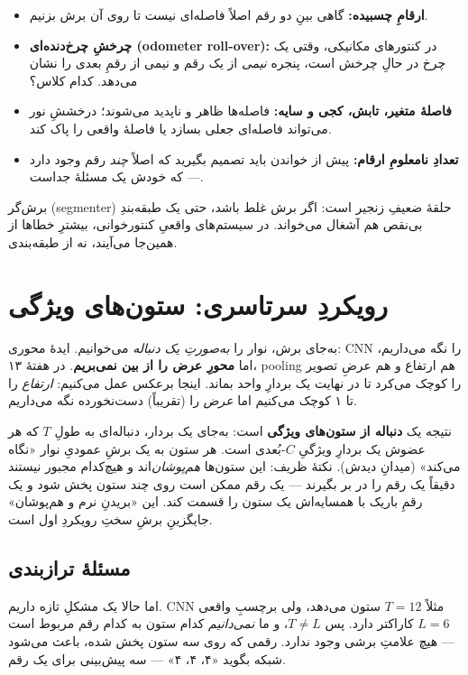 \documentclass[12pt,a4paper]{article}
\begin{document}
\begin{itemize}
  \item \textbf{ارقامِ چسبیده:} گاهی بینِ دو رقم اصلاً فاصله‌ای نیست تا روی آن برش بزنیم.
  \item \textbf{چرخشِ چرخ‌دنده‌ای (odometer roll-over):} در کنتورهای مکانیکی، وقتی یک چرخ در حالِ چرخش است، پنجره \emph{نیمی} از یک رقم و نیمی از رقمِ بعدی را نشان می‌دهد. کدام کلاس؟
  \item \textbf{فاصلهٔ متغیر، تابش، کجی و سایه:} فاصله‌ها ظاهر و ناپدید می‌شوند؛ درخششِ نور می‌تواند فاصله‌ای جعلی بسازد یا فاصلهٔ واقعی را پاک کند.
  \item \textbf{تعدادِ نامعلومِ ارقام:} پیش از خواندن باید تصمیم بگیرید که اصلاً \emph{چند} رقم وجود دارد — که خودش یک مسئلهٔ جداست.
\end{itemize}

\begin{hoshdar}
برش‌گر (segmenter) حلقهٔ ضعیفِ زنجیر است: اگر برش غلط باشد، حتی یک طبقه‌بندِ بی‌نقص هم آشغال می‌خواند. در سیستم‌های واقعیِ کنتورخوانی، بیشترِ خطاها از همین‌جا می‌آیند، نه از طبقه‌بندی.
\end{hoshdar}

\section{رویکردِ سرتاسری: ستون‌های ویژگی}

به‌جای برش، نوار را \emph{به‌صورتِ یک دنباله} می‌خوانیم. ایدهٔ محوری: CNN را نگه می‌داریم، اما \textbf{محورِ عرض را از بین نمی‌بریم}. در هفتهٔ ۱۳، pooling هم ارتفاع و هم عرضِ تصویر را کوچک می‌کرد تا در نهایت یک بردارِ واحد بماند. اینجا برعکس عمل می‌کنیم: \emph{ارتفاع} را تا ۱ کوچک می‌کنیم اما \emph{عرض} را (تقریباً) دست‌نخورده نگه می‌داریم.

نتیجه یک \textbf{دنباله از ستون‌های ویژگی} است: به‌جای یک بردار، دنباله‌ای به طولِ $T$ که هر عضوش یک بردارِ ویژگیِ $C$-بُعدی است. هر ستون به یک برشِ عمودیِ نوار «نگاه می‌کند» (میدانِ دیدش). نکتهٔ ظریف: این ستون‌ها \emph{هم‌پوشان}‌اند و هیچ‌کدام مجبور نیستند دقیقاً یک رقم را در بر بگیرند — یک رقم ممکن است روی چند ستون پخش شود و یک رقمِ باریک با همسایه‌اش یک ستون را قسمت کند. این «بریدنِ نرم و هم‌پوشان» جایگزینِ برشِ سختِ رویکردِ اول است.

\subsection{مسئلهٔ ترازبندی}

اما حالا یک مشکلِ تازه داریم. CNN مثلاً $T=12$ ستون می‌دهد، ولی برچسبِ واقعی $L=6$ کاراکتر دارد. پس $T \neq L$، و ما \emph{نمی‌دانیم} کدام ستون به کدام رقم مربوط است — هیچ علامتِ برشی وجود ندارد. رقمی که روی سه ستون پخش شده، باعث می‌شود شبکه بگوید «۴، ۴، ۴» — سه پیش‌بینی برای یک رقم.
\end{document}
